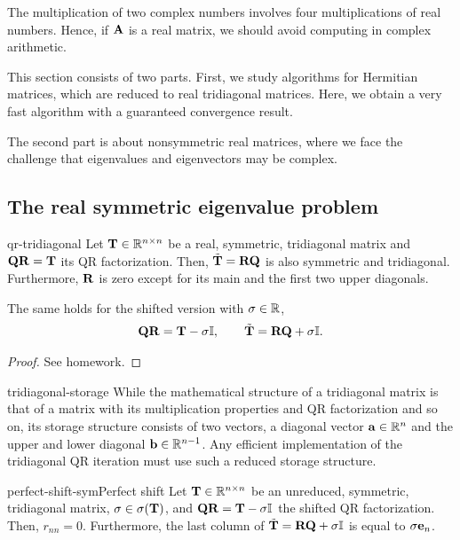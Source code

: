 \begin{intro}
  The multiplication of two complex numbers involves four
  multiplications of real numbers. Hence, if $\mathbf A$ is a real matrix,
  we should avoid computing in complex arithmetic.

  This section consists of two parts. First, we study algorithms for
  Hermitian matrices, which are reduced to real tridiagonal
  matrices. Here, we obtain a very fast algorithm with a guaranteed
  convergence result.

  The second part is about nonsymmetric real matrices, where we face
  the challenge that eigenvalues and eigenvectors may be complex.
\end{intro}

\subsection{The real symmetric eigenvalue problem}

\begin{Lemma}{qr-tridiagonal}
  Let $\mathbf T\in\mathbb R^{n\times n}$ be a real, symmetric, tridiagonal matrix and
  $\mathbf Q\mathbf R=\mathbf T$ its QR factorization. Then, $\tilde{\mathbf T}=\mathbf R\mathbf Q$ is also
  symmetric and tridiagonal. Furthermore, $\mathbf R$ is zero except for
  its main and the first two upper diagonals.

  The same holds for the shifted version with $\sigma\in\mathbb R$,
  \begin{gather}
    \mathbf Q\mathbf R = \mathbf T-\sigma\mathbb I,\qquad \tilde{\mathbf T} = \mathbf R\mathbf Q+\sigma\mathbb I.
  \end{gather}
\end{Lemma}

\begin{proof}
  See homework.
\end{proof}

\begin{Remark}{tridiagonal-storage}
  While the mathematical structure of a tridiagonal matrix is that of
  a matrix with its multiplication properties and QR factorization and
  so on, its storage structure consists of two vectors, a diagonal
  vector $\mathbf a\in\mathbb R^n$ and the upper and lower diagonal
  $\mathbf b\in\mathbb R^{n-1}$. Any efficient implementation of the tridiagonal QR
  iteration must use such a reduced storage structure.
\end{Remark}

\begin{Lemma*}{perfect-shift-sym}{Perfect shift}
  Let $\mathbf T\in\mathbb R^{n\times n}$ be an unreduced, symmetric, tridiagonal matrix,
  $\sigma\in\sigma(\mathbf T)$, and $\mathbf Q\mathbf R=\mathbf T-\sigma\mathbb I$ the
  shifted QR factorization. Then, $r_{nn}=0$. Furthermore, the last
  column of $\tilde{\mathbf T} = \mathbf R\mathbf Q+\sigma\mathbb I$ is equal to
  $\sigma\mathbf e_n$.
\end{Lemma*}

